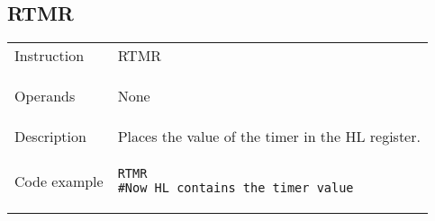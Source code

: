 \subsection{RTMR}
\renewcommand*{\arraystretch}{2.0}
\begin{longtable}{P{3cm}P{9cm}}
\midrule
\noindent Instruction & RTMR \\
\noindent Operands &
\begin{itemize}[label={},noitemsep,leftmargin=*,topsep=0pt,partopsep=0pt, itemsep=1em]None\end{itemize}\\
\noindent Description & Places the value of the timer in the HL register. \\
\noindent Code example & 
\begin{lstlisting}
RTMR
#Now HL contains the timer value
\end{lstlisting} \\
\end{longtable}

